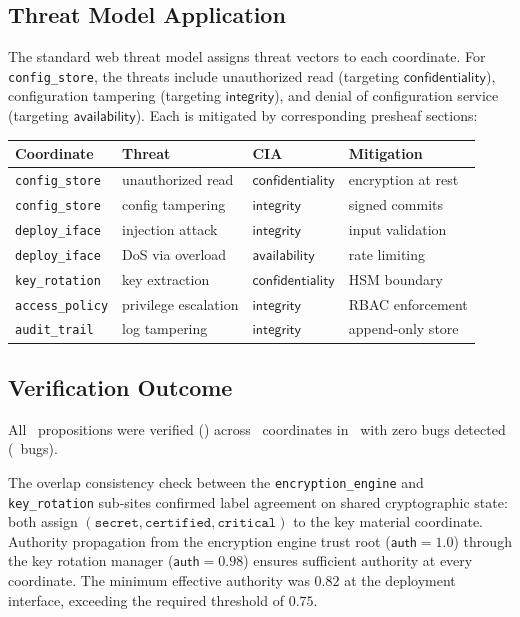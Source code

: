 \documentclass[11pt]{article}
\newcommand{\AuthLevel}{\mathsf{auth}}
\newcommand{\Confid}{\mathsf{confidentiality}}
\newcommand{\Integrity}{\mathsf{integrity}}
\newcommand{\Avail}{\mathsf{availability}}
\begin{document}
\subsection{Threat Model Application}

The standard web threat model assigns threat vectors to each
coordinate.  For \texttt{config\_store}, the threats include
unauthorized read (targeting $\Confid$), configuration tampering
(targeting $\Integrity$), and denial of configuration service
(targeting $\Avail$).  Each is mitigated by corresponding presheaf
sections:

\begin{center}
\begin{tabular}{llll}
\toprule
\textbf{Coordinate} & \textbf{Threat} & \textbf{CIA}
  & \textbf{Mitigation} \\
\midrule
\texttt{config\_store}   & unauthorized read   & $\Confid$
  & encryption at rest \\
\texttt{config\_store}   & config tampering     & $\Integrity$
  & signed commits \\
\texttt{deploy\_iface}   & injection attack     & $\Integrity$
  & input validation \\
\texttt{deploy\_iface}   & DoS via overload     & $\Avail$
  & rate limiting \\
\texttt{key\_rotation}   & key extraction       & $\Confid$
  & HSM boundary \\
\texttt{access\_policy}  & privilege escalation & $\Integrity$
  & RBAC enforcement \\
\texttt{audit\_trail}    & log tampering        & $\Integrity$
  & append-only store \\
\bottomrule
\end{tabular}
\end{center}

\subsection{Verification Outcome}

All \ppLXIXsecsecureconfigProps\ propositions were verified
(\ppLXIXsecsecureconfigVerdict) across \ppLXIXsecsecureconfigCoords\
coordinates in \ppLXIXsecsecureconfigTime\ with zero bugs detected
(\ppLXIXsecsecureconfigBugs\ bugs).

The overlap consistency check between the \texttt{encryption\_engine}
and \texttt{key\_rotation} sub-sites confirmed label agreement on
shared cryptographic state: both assign
$(\texttt{secret}, \texttt{certified}, \texttt{critical})$ to the
key material coordinate.  Authority propagation from the encryption
engine trust root ($\AuthLevel = 1.0$) through the key rotation
manager ($\AuthLevel = 0.98$) ensures sufficient authority at every
coordinate.  The minimum effective authority was $0.82$
at the deployment interface, exceeding the required threshold of
$0.75$.
\end{document}
